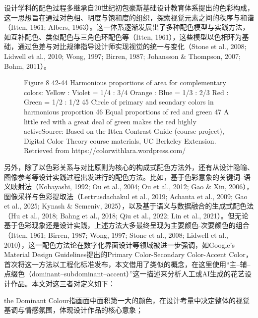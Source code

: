 设计学科的配色过程多继承自20世纪初包豪斯基础设计教育体系提出的色彩构成，这一思想旨在通过对色相、明度与饱和度的组织，探索视觉元素之间的秩序与和谐（Itten, 1961; Albers, 1963）。这一体系逐渐发展出了多种配色模型与实践方法，如互补配色、类似配色与三角色环配色等（Itten, 1961），这些模型以色相环为基础，通过色差与对比规律指导设计师实现视觉的统一与变化（Stone et al., 2008; Lidwell et al., 2010; Wong, 1997; Birren, 1987; Johansson \& Thompson, 2007; Bohm, 2011）。

\begin{figure}[htbp]

  \centering



  \caption{Figure 8 42-44 Harmonious proportions of area for complementary colors: Yellow : Violet = 1/4 : 3/4 Orange : Blue = 1/3 : 2/3 Red : Green = 1/2 : 1/2 45 Circle of primary and seondary colors in harmonious proportion 46 Equal proportions of red and green 47 A little red with a great deal of green makes the red highly activeSource: Based on the Itten Contrast Guide (course project), Digital Color Theory course materials, UC Berkeley Extension. Retrieved from https://colorwithlara.wordpress.com/}

  \label{fig:figure_8_42_44_harmonious_proportions_of}

\end{figure}

另外，除了以色彩关系与对比原则为核心的构成式配色方法外，还有从设计隐喻、图像参考等设计实践过程出发进行的配色方法。比如，基于色彩意象的关键词–语义映射法（Kobayashi, 1992; Ou et al., 2004; Ou et al., 2012; Gao \& Xin, 2006），图像采样与色彩提取法（Lertrusdachakul et al., 2019; Achanta et al., 2009; Gao et al., 2025; Kynash \& Semeniv, 2025），以及基于语义与数据融合的生成式配色法（Hu et al., 2018; Bahng et al., 2018; Qiu et al., 2022; Lin et al., 2021）。但无论基于色彩现象还是设计实践，上述方法大多最终呈现为主要颜色-次要颜色的组合（Itten, 1961; Birren, 1987; Wong, 1997; Stone et al., 2008; Lidwell et al., 2010），这一配色方法论在数字化界面设计等领域被进一步强调，如Google’s Material Design Guidelines提出的Primary Color-Secondary Color-Accent Color，首次将这一方法以工程化标准发布，本文借用了类似的概念，在这里使用“主–辅–点缀色（dominant–subdominant–accent）”这一描述来分析人工或AI生成的花艺设计作品。本文对这三者对定义如下：

the Dominant Colour指画面中面积第一大的颜色，在设计考量中决定整体的视觉基调与情感氛围，体现设计作品的核心意象；


